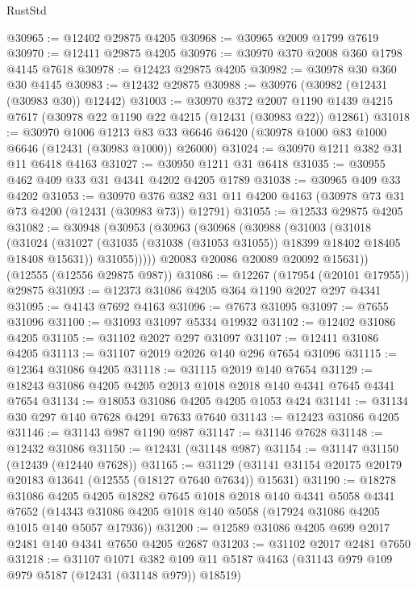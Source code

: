 \begin{lexlean}{RustStd}
\begin{coremodule}
@30965 := @12402 @29875 @4205
@30968 := @30965 @2009 @1799 @7619
@30970 := @12411 @29875 @4205
@30976 := @30970 @370 @2008 @360 @1798 @4145 @7618
@30978 := @12423 @29875 @4205
@30982 := @30978 @30 @360 @30 @4145
@30983 := @12432 @29875
@30988 := @30976 (@30982 (@12431 (@30983 @30)) @12442)
@31003 := @30970
    @372
    @2007
    @1190
    @1439
    @4215
    @7617
    (@30978 @22 @1190 @22 @4215 (@12431 (@30983 @22)) @12861)
@31018 := @30970
    @1006
    @1213
    @83
    @33
    @6646
    @6420
    (@30978 @1000 @83 @1000 @6646 (@12431 (@30983 @1000)) @26000)
@31024 := @30970 @1211 @382 @31 @11 @6418 @4163
@31027 := @30950 @1211 @31 @6418
@31035 := @30955 @462 @409 @33 @31 @4341 @4202 @4205 @1789
@31038 := @30965 @409 @33 @4202
@31053 := @30970
    @376
    @382
    @31
    @11
    @4200
    @4163
    (@30978 @73 @31 @73 @4200 (@12431 (@30983 @73)) @12791)
@31055 := @12533 @29875 @4205
@31082 := @30948
    (@30953
      (@30963
        (@30968
          (@30988
            (@31003
              (@31018
                (@31024
                  (@31027 (@31035 (@31038 (@31053 @31055)) @18399 @18402 @18405 @18408 @15631))
                  @31055)))))
        @20083
        @20086
        @20089
        @20092
        @15631))
    (@12555 (@12556 @29875 @987))
@31086 := @12267 (@17954 (@20101 @17955)) @29875
@31093 := @12373 @31086 @4205 @364 @1190 @2027 @297 @4341
@31095 := @4143 @7692 @4163
@31096 := @7673 @31095
@31097 := @7655 @31096
@31100 := @31093 @31097 @5334 @19932
@31102 := @12402 @31086 @4205
@31105 := @31102 @2027 @297 @31097
@31107 := @12411 @31086 @4205
@31113 := @31107 @2019 @2026 @140 @296 @7654 @31096
@31115 := @12364 @31086 @4205
@31118 := @31115 @2019 @140 @7654
@31129 := @18243 @31086 @4205 @4205 @2013 @1018 @2018 @140 @4341 @7645 @4341 @7654
@31134 := @18053 @31086 @4205 @4205 @1053 @424
@31141 := @31134 @30 @297 @140 @7628 @4291 @7633 @7640
@31143 := @12423 @31086 @4205
@31146 := @31143 @987 @1190 @987
@31147 := @31146 @7628
@31148 := @12432 @31086
@31150 := @12431 (@31148 @987)
@31154 := @31147 @31150 (@12439 (@12440 @7628))
@31165 := @31129 (@31141 @31154 @20175 @20179 @20183 @13641 (@12555 (@18127 @7640 @7634)) @15631)
@31190 := @18278
    @31086
    @4205
    @4205
    @18282
    @7645
    @1018
    @2018
    @140
    @4341
    @5058
    @4341
    @7652
    (@14343 @31086 @4205 @1018 @140 @5058 (@17924 @31086 @4205 @1015 @140 @5057 @17936))
@31200 := @12589 @31086 @4205 @699 @2017 @2481 @140 @4341 @7650 @4205 @2687
@31203 := @31102 @2017 @2481 @7650
@31218 := @31107
    @1071
    @382
    @109
    @11
    @5187
    @4163
    (@31143 @979 @109 @979 @5187 (@12431 (@31148 @979)) @18519)

\end{coremodule}
\end{lexlean}

